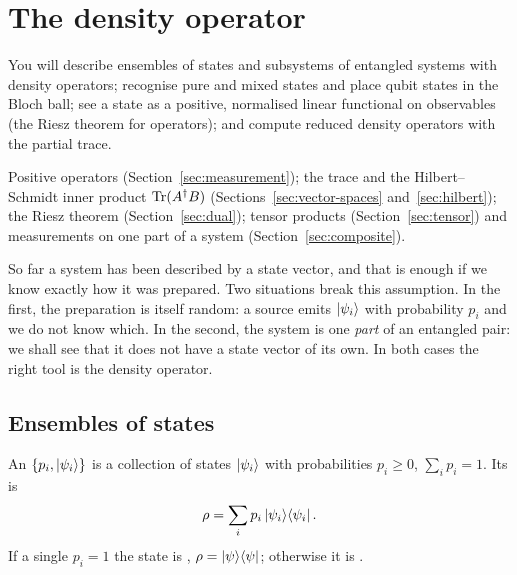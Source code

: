 \section{The density operator}\label{sec:density}

\begin{objectives}
  You will describe ensembles of states and subsystems of entangled systems with density operators; recognise pure and mixed states and place qubit states in the Bloch ball; see a state as a positive, normalised linear functional on observables (the Riesz theorem for operators); and compute reduced density operators with the partial trace.
\end{objectives}

\begin{recall}
  Positive operators (Section~\ref{sec:measurement}); the trace and the Hilbert--Schmidt inner product $\operatorname{Tr}(A^\dagger B)$ (Sections~\ref{sec:vector-spaces} and~\ref{sec:hilbert}); the Riesz theorem (Section~\ref{sec:dual}); tensor products (Section~\ref{sec:tensor}) and measurements on one part of a system (Section~\ref{sec:composite}).
\end{recall}

So far a system has been described by a state vector, and that is enough if we know exactly how it was prepared. Two situations break this assumption. In the first, the preparation is itself random: a source emits $\left|\psi_i\right\rangle$ with probability $p_i$ and we do not know which.
In the second, the system is one \emph{part} of an entangled pair: we shall see that it does not have a state vector of its own. In both cases the right tool is the density operator.

\subsection{Ensembles of states}

\begin{definition}\label{def:density}
  An  $\{p_i,\left|\psi_i\right\rangle\}$ is a collection of states $\left|\psi_i\right\rangle$ with probabilities $p_i\ge0$, $\sum_ip_i=1$. Its  is
  \[
    \rho=\sum_ip_i\left|\psi_i\right\rangle\!\left\langle\psi_i\right|.
  \]
  If a single $p_i=1$ the state is , $\rho=\left|\psi\right\rangle\!\left\langle\psi\right|$; otherwise it is .
\end{definition}

